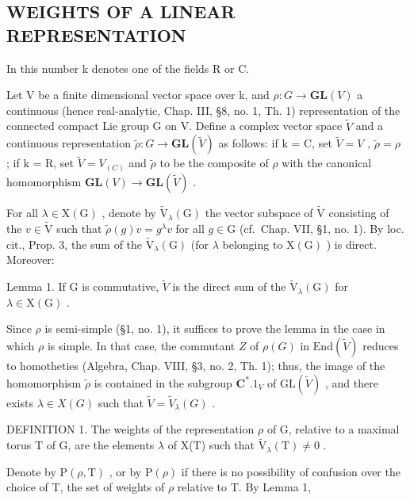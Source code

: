 \subsection{WEIGHTS OF A LINEAR REPRESENTATION}

In this number k denotes one of the fields R or C.

Let V be a finite dimensional vector space over k, and \(\rho: G \to \mathbf{GL}(V)\) a continuous (hence real-analytic, Chap. III, §8, no. 1, Th. 1) representation of the connected compact Lie group G on V. Define a complex vector space \(\tilde{V}\) and a continuous representation \(\tilde{\rho}: G \to \mathbf{GL}(\tilde{V})\) as follows: if k = C, set \(\tilde{V} = V\) , \(\tilde{\rho} = \rho\) ; if k = R, set \(\tilde{V} = V_{(C)}\) and \(\tilde{\rho}\) to be the composite of \(\rho\) with the canonical homomorphism \(\mathbf{GL}(V) \to \mathbf{GL}(\tilde{V})\) .

For all \(\lambda \in \mathrm{X}(\mathrm{G})\) , denote by \(\tilde{\mathrm{V}}_{\lambda}(\mathrm{G})\) the vector subspace of \(\tilde{\mathrm{V}}\) consisting of the \(v \in \tilde{\mathrm{V}}\) such that \(\tilde{\rho}(g)v = g^{\lambda}v\) for all \(g \in \mathrm{G}\) (cf.~Chap. VII, §1, no. 1). By loc. cit., Prop. 3, the sum of the \(\tilde{\mathrm{V}}_{\lambda}(\mathrm{G})\) (for \(\lambda\) belonging to \(\mathrm{X}(\mathrm{G})\) ) is direct. Moreover:

Lemma 1. If G is commutative, \(\tilde{V}\) is the direct sum of the \(\tilde{\mathrm{V}}_{\lambda}(\mathrm{G})\) for \(\lambda \in \mathrm{X}(\mathrm{G})\) .

Since \(\rho\) is semi-simple (§1, no. 1), it suffices to prove the lemma in the case in which \(\rho\) is simple. In that case, the commutant \(Z\) of \(\rho(G)\) in \(\mathrm{End}(\tilde{V})\) reduces to homotheties (Algebra, Chap. VIII, §3, no. 2, Th. 1); thus, the image of the homomorphism \(\tilde{\rho}\) is contained in the subgroup \(\mathbf{C}^*.1_V\) of \(\mathrm{GL}(\tilde{V})\) , and there exists \(\lambda \in X(G)\) such that \(\tilde{V} = \tilde{V}_{\lambda}(G)\) .

DEFINITION 1. The weights of the representation \(\rho\) of G, relative to a maximal torus T of G, are the elements \(\lambda\) of X(T) such that \(\tilde{\mathrm{V}}_{\lambda}(\mathrm{T}) \neq 0\) .

Denote by \(\mathrm{P}(\rho,\mathrm{T})\) , or by \(\mathrm{P}(\rho)\) if there is no possibility of confusion over the choice of T, the set of weights of \(\rho\) relative to T. By Lemma 1,

